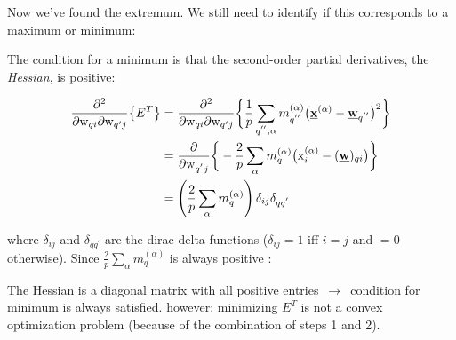 \begin{frame}

Now we've found the extremum. We still need to identify if this corresponds to a maximum or minimum:


The condition for a minimum is that the second-order partial derivatives, the \emph{Hessian}, is positive:

\begin{align}
	\frac{\partial^2}{\partial \mathrm{w}_{qi} \partial \mathrm{w}_{
			q'j}} \big\{ E^T\big\}
	&=
		\frac{\partial^2}{\partial \mathrm{w}_{qi} \partial \mathrm{w}_{
			q'j}} \bigg\{ \frac{1}{p} \sum\limits_{q^{''}, \alpha}
			m_{q^{''}}^{(\alpha)} \big( \vec{x}^{(\alpha)} - \vec{w}_{q^{''}}
			\big)^2 \bigg\} \\
		& = \frac{\partial}{\partial \mathrm{w}_{q^{'}j}} \bigg\{
			-\frac{2}{p} \sum\limits_{\alpha} m_q^{(\alpha)} 
			\big( \mathrm{x}_i^{(\alpha)} - (\vec{w})_{qi}
			\big) \bigg\} \\
\notesonly{
		& = \left( \frac{2}{p} \sum\limits_{\alpha} m_q^{(\alpha)} \right)
			\delta_{ij} \delta_{qq^{'}}
			}
\end{align}
\end{frame}

\begin{frame}

where $\delta_{ij}$ and $\delta_{qq^{'}}$ are the dirac-delta functions ($\delta_{ij}=1$ iff $i=j$ and $=0$ otherwise). 
Since $\frac{2}{p} \sum\limits_{\alpha} m_q^{(\alpha)}$ is always positive :

\begin{itemize}
	 \itR The Hessian is a diagonal matrix with all positive entries $\,\to\,$ condition for minimum is always satisfied.
	 \itR however: minimizing $E^{T}$ is not a convex optimization problem (because of the combination of steps 1 and 2).
\end{itemize} 

\end{frame}

